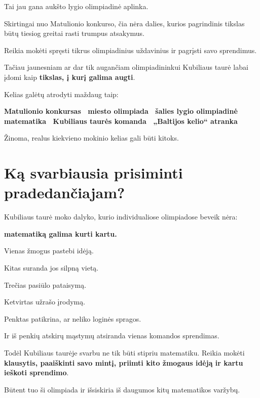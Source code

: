 \documentclass[11pt,a4paper]{article}
\begin{document}
Tai jau gana aukšto lygio olimpiadinė aplinka.

Skirtingai nuo Matulionio konkurso, čia nėra dalies, kurios pagrindinis tikslas būtų tiesiog greitai rasti trumpus atsakymus.

Reikia mokėti spręsti tikrus olimpiadinius uždavinius ir pagrįsti savo sprendimus.

Tačiau jaunesniam ar dar tik augančiam olimpiadininkui Kubiliaus taurė labai įdomi kaip \textbf{tikslas, į kurį galima augti}.

Kelias galėtų atrodyti maždaug taip:

\begin{infobox}
\centering
\textbf{Matulionio konkursas \textrightarrow\ miesto olimpiada \textrightarrow\ šalies lygio olimpiadinė matematika \textrightarrow\ Kubiliaus taurės komanda \textrightarrow\ „Baltijos kelio“ atranka}
\end{infobox}

Žinoma, realus kiekvieno mokinio kelias gali būti kitoks.

\section{Ką svarbiausia prisiminti pradedančiajam?}

Kubiliaus taurė moko dalyko, kurio individualiose olimpiadose beveik nėra:

\begin{center}
\textbf{matematiką galima kurti kartu.}
\end{center}

Vienas žmogus pastebi idėją.

Kitas suranda jos silpną vietą.

Trečias pasiūlo pataisymą.

Ketvirtas užrašo įrodymą.

Penktas patikrina, ar neliko loginės spragos.

Ir iš penkių atskirų mąstymų atsiranda vienas komandos sprendimas.

Todėl Kubiliaus taurėje svarbu ne tik būti stipriu matematiku. Reikia mokėti \textbf{klausytis, paaiškinti savo mintį, priimti kito žmogaus idėją ir kartu ieškoti sprendimo}.

Būtent tuo ši olimpiada ir išsiskiria iš daugumos kitų matematikos varžybų.
\end{document}
